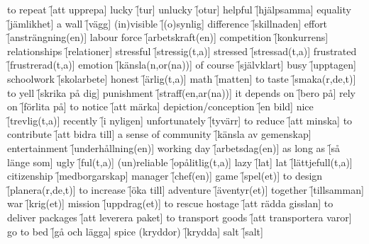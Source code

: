 \begin{questions}
    \begin{multicols}{2}
        \raggedcolumns
        \question to repeat \f[att upprepa]
        \question lucky \f[tur]
        \question unlucky \f[otur]
        \question helpful \f[hjälpsamma]
        \question equality \f[jämlikhet]
        \question a wall \f[vägg]
        \question (in)visible \f[(o)synlig]
        \question difference \f[skillnaden]
        \question effort \f[ansträngning(en)]
        \question labour force \f[arbetskraft(en)]
        \question competition \f[konkurrens]
        \question relationships \f[relationer]
        \question stressful \f[stressig(t,a)]
        \question stressed \f[stressad(t,a)]
        \question frustrated \f[frustrerad(t,a)]
        \question emotion \f[känsla(n,or(na))]
        \question of course \f[självklart]
        \question busy \f[upptagen]
        \question schoolwork \f[skolarbete]
        \question honest \f[ärlig(t,a)]
        \question math \f[matten]
        \question to taste \f[smaka(r,de,t)]
        \question to yell \f[skrika på dig]
        \question punishment \f[straff(en,ar(na))]
        \question it depends on \f[bero på]
        \question rely on \f[förlita på]
        \question to notice \f[att märka]
        \question depiction/conception \f[en bild]
        \question nice \f[trevlig(t,a)]
        \question recently \f[i nyligen]
        \question unfortunately \f[tyvärr]
        \question to reduce \f[att minska]
        \question to contribute \f[att bidra till]
        \question a sense of community \f[känsla av gemenskap]
        \question entertainment \f[underhållning(en)]
        \question working day \f[arbetsdag(en)]
        \question as long as \f[så länge som]
        \question ugly \f[ful(t,a)]
        \question (un)reliable \f[opålitlig(t,a)]
        \question lazy \f[lat]
        \question lat \f[lättjefull(t,a)]
        \question citizenship \f[medborgarskap]
        \question manager \f[chef(en)]
        \question game \f[spel(et)]
        \question to design \f[planera(r,de,t)]
        \question to increase \f[öka till]
        \question adventure \f[äventyr(et)]
        \question together \f[tillsamman]
        \question war \f[krig(et)]
        \question mission \f[uppdrag(et)]
        \question to rescue hostage  \f[att rädda gisslan]
        \question to deliver packages \f[att leverera paket]
        \question to transport goods \f[att transportera varor]
        \question go to bed \f[gå och lägga]
        \question spice (kryddor) \f[krydda]
        \question salt \f[salt]

\end{multicols}
\end{questions}
